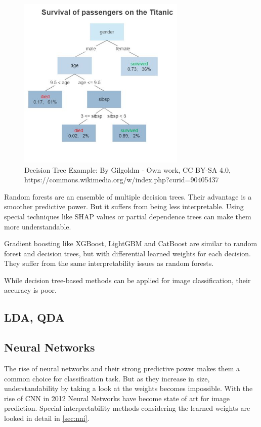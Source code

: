 \begin{figure}[h!]
	\centering
	\includegraphics[width=80mm]{figs/Decision_Tree}
	\caption{Decision Tree Example: By Gilgoldm - Own work, CC BY-SA 4.0, https://commons.wikimedia.org/w/index.php?curid=90405437}
	\label{fig:decision_tree}
\end{figure}
 

Random forests are an ensemble of multiple decision trees. Their advantage is a smoother predictive power. But it suffers from being less interpretable. Using special techniques like SHAP values \cite{lundberg2017unified} or partial dependence trees can make them more understandable.

Gradient boosting like XGBoost, LightGBM and CatBoost are similar to random forest and decision trees, but with differential learned weights for each decision. They suffer from the same interpretability issues as random  forests.

While decision tree-based methods can be applied for image classification, their accuracy is poor.

\subsection{LDA, QDA}


\subsection{Neural Networks}

The rise of neural networks and their strong predictive power makes them a common choice for classification task. But as they increase in size, understandability by taking a look at the weights becomes impossible. With the rise of CNN in 2012  \cite{krizhevsky2012nn} Neural Networks have become state of art for image prediction. Special interpretability methods considering the learned weights are looked in detail in \ref{sec:nni}.


